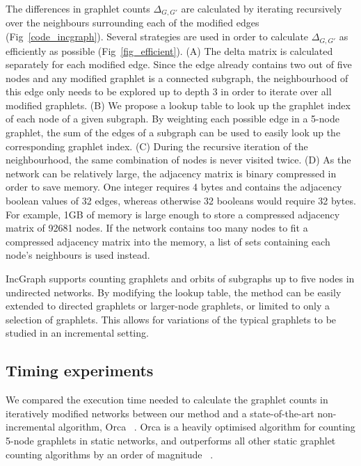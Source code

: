 The differences in graphlet counts $\Delta_{G, G'}$ are calculated by iterating recursively over the neighbours surrounding each of the modified edges (Fig~\ref{code_incgraph}). Several strategies are used in order to calculate $\Delta_{G,G'}$ as efficiently as possible (Fig~\ref{fig_efficient}).
(A) The delta matrix is calculated separately for each modified edge. Since the edge already contains two out of five nodes and any modified graphlet is a connected subgraph, the neighbourhood of this edge only needs to be explored up to depth 3 in order to iterate over all modified graphlets. 
(B) We propose a lookup table to look up the graphlet index of each node of a given subgraph. By weighting each possible edge in a 5-node graphlet, the sum of the edges of a subgraph can be used to easily look up the corresponding graphlet index.
(C) During the recursive iteration of the neighbourhood, the same combination of nodes is never visited twice.
(D) As the network can be relatively large, the adjacency matrix is binary compressed in order to save memory. One integer requires 4 bytes and contains the adjacency boolean values of 32 edges, whereas otherwise 32 booleans would require 32 bytes. For example, 1GB of memory is large enough to store a compressed adjacency matrix of 92681 nodes. If the network contains too many nodes to fit a compressed adjacency matrix into the memory, a list of sets containing each node's neighbours is used instead.




IncGraph supports counting graphlets and orbits of subgraphs up to five nodes in undirected networks. By modifying the lookup table, the method can be easily extended to directed graphlets or larger-node graphlets, or limited to only a selection of graphlets. This allows for variations of the typical graphlets to be studied in an incremental setting.

\subsection*{Timing experiments}
We compared the execution time needed to calculate the graphlet counts in iteratively modified networks between our method and a state-of-the-art non-incremental algorithm, Orca~ \cite{hocevar_combinatorialapproachgraphlet_2014}. Orca is a heavily optimised algorithm for counting 5-node graphlets in static networks, and outperforms all other static graphlet counting algorithms by an order of magnitude~ \cite{hocevar_combinatorialapproachgraphlet_2014}.

